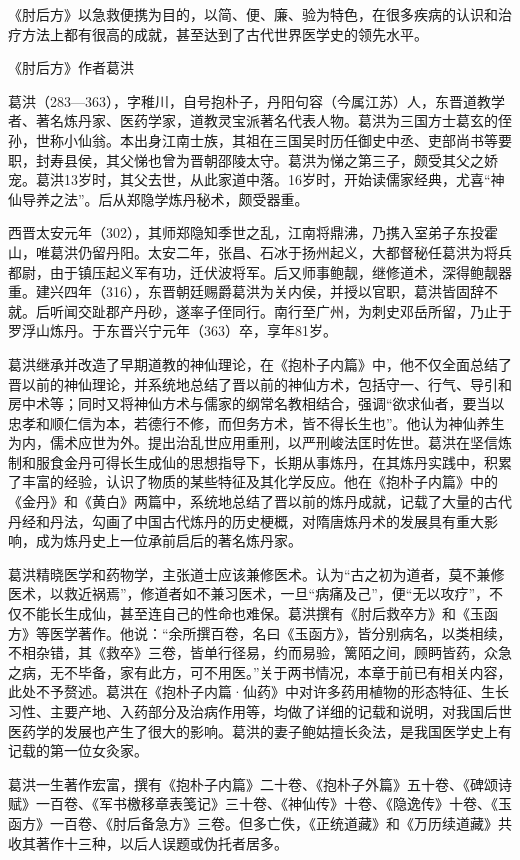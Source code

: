 \documentclass[12pt,UTF8]{ctexbook}
\begin{document}
《肘后方》以急救便携为目的，以简、便、廉、验为特色，在很多疾病的认识和治疗方法上都有很高的成就，甚至达到了古代世界医学史的领先水平。

《肘后方》作者葛洪

葛洪（283—363），字稚川，自号抱朴子，丹阳句容（今属江苏）人，东晋道教学者、著名炼丹家、医药学家，道教灵宝派著名代表人物。葛洪为三国方士葛玄的侄孙，世称小仙翁。本出身江南士族，其祖在三国吴时历任御史中丞、吏部尚书等要职，封寿县侯，其父悌也曾为晋朝邵陵太守。葛洪为悌之第三子，颇受其父之娇宠。葛洪13岁时，其父去世，从此家道中落。16岁时，开始读儒家经典，尤喜“神仙导养之法”。后从郑隐学炼丹秘术，颇受器重。

西晋太安元年（302），其师郑隐知季世之乱，江南将鼎沸，乃携入室弟子东投霍山，唯葛洪仍留丹阳。太安二年，张昌、石冰于扬州起义，大都督秘任葛洪为将兵都尉，由于镇压起义军有功，迁伏波将军。后又师事鲍靓，继修道术，深得鲍靓器重。建兴四年（316），东晋朝廷赐爵葛洪为关内侯，并授以官职，葛洪皆固辞不就。后听闻交趾郡产丹砂，遂率子侄同行。南行至广州，为刺史邓岳所留，乃止于罗浮山炼丹。于东晋兴宁元年（363）卒，享年81岁。

葛洪继承并改造了早期道教的神仙理论，在《抱朴子内篇》中，他不仅全面总结了晋以前的神仙理论，并系统地总结了晋以前的神仙方术，包括守一、行气、导引和房中术等；同时又将神仙方术与儒家的纲常名教相结合，强调“欲求仙者，要当以忠孝和顺仁信为本，若德行不修，而但务方术，皆不得长生也”。他认为神仙养生为内，儒术应世为外。提出治乱世应用重刑，以严刑峻法匡时佐世。葛洪在坚信炼制和服食金丹可得长生成仙的思想指导下，长期从事炼丹，在其炼丹实践中，积累了丰富的经验，认识了物质的某些特征及其化学反应。他在《抱朴子内篇》中的《金丹》和《黄白》两篇中，系统地总结了晋以前的炼丹成就，记载了大量的古代丹经和丹法，勾画了中国古代炼丹的历史梗概，对隋唐炼丹术的发展具有重大影响，成为炼丹史上一位承前启后的著名炼丹家。

葛洪精晓医学和药物学，主张道士应该兼修医术。认为“古之初为道者，莫不兼修医术，以救近祸焉”，修道者如不兼习医术，一旦“病痛及己”，便“无以攻疗”，不仅不能长生成仙，甚至连自己的性命也难保。葛洪撰有《肘后救卒方》和《玉函方》等医学著作。他说：“余所撰百卷，名曰《玉函方》，皆分别病名，以类相续，不相杂错，其《救卒》三卷，皆单行径易，约而易验，篱陌之间，顾眄皆药，众急之病，无不毕备，家有此方，可不用医。”关于两书情况，本章于前已有相关内容，此处不予赘述。葛洪在《抱朴子内篇·仙药》中对许多药用植物的形态特征、生长习性、主要产地、入药部分及治病作用等，均做了详细的记载和说明，对我国后世医药学的发展也产生了很大的影响。葛洪的妻子鲍姑擅长灸法，是我国医学史上有记载的第一位女灸家。

葛洪一生著作宏富，撰有《抱朴子内篇》二十卷、《抱朴子外篇》五十卷、《碑颂诗赋》一百卷、《军书檄移章表笺记》三十卷、《神仙传》十卷、《隐逸传》十卷、《玉函方》一百卷、《肘后备急方》三卷。但多亡佚，《正统道藏》和《万历续道藏》共收其著作十三种，以后人误题或伪托者居多。
\end{document}
